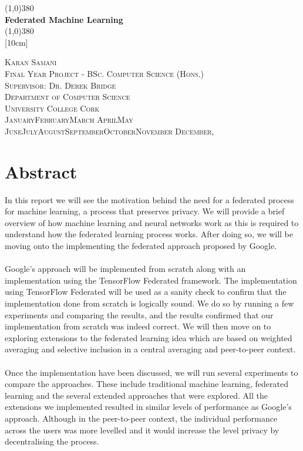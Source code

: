 \documentclass[12pt]{article}
\newcommand{\dateasreq}{\ifcase \month \or January\or February\or March\or %
April\or May \or June\or July\or August\or September\or October\or November\or %
December\fi, \number \year}
\begin{document}
\makeatletter

\begin{titlepage}
	\begin{center}
		\line(1,0){380}\\				
		[0.32cm]
		\huge{\bfseries Federated Machine Learning}\\
		[0.16cm]		
		\line(1,0){380}\\
		[10cm]
	\end{center}
	\begin{center}	
		\textsc{\large Karan Samani}\\
		\textsc{\large Final Year Project - BSc. Computer Science (Hons.)}\\
		\textsc{\large Supervisor: Dr. Derek Bridge}\\
		\textsc{\large Department of Computer Science}\\
		\textsc{\large University College Cork}\\
		\textsc{\large \dateasreq}
	\end{center}
\end{titlepage}
\cleardoublepage

\section*{Abstract}
In this report we will see the motivation behind the need for a federated process for machine learning, a process that preserves privacy. We will provide a brief overview of how machine learning and neural networks work as this is required to understand how the federated learning process works. After doing so, we will be moving onto the implementing the federated approach proposed by Google.
\\\\
Google's approach will be implemented from scratch along with an implementation using the TensorFlow Federated framework. The implementation using TensorFlow Federated will be used as a sanity check to confirm that the implementation done from scratch is logically sound. We do so by running a few experiments and comparing the results, and the results confirmed that our implementation from scratch was indeed correct. We will then move on to exploring extensions to the federated learning idea which are based on weighted averaging and selective inclusion in a central averaging and peer-to-peer context. 
\\\\ 
Once the implementation have been discussed, we will run several experiments to compare the approaches. These include traditional machine learning, federated learning and the several extended approaches that were explored. All the extensions we implemented resulted in similar levels of performance as Google's approach. Although in the peer-to-peer context, the individual performance across the users was more levelled and it would increase the level privacy by decentralising the process. 
\clearpage
\end{document}
